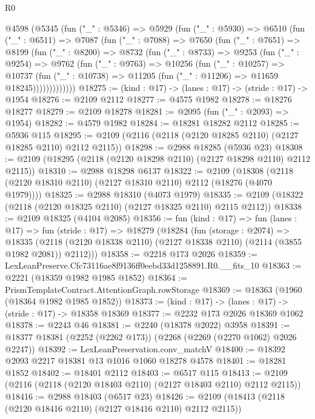 \begin{lexlean}{R0}
\begin{coremodule}
  @4598
    (@5345
      (fun ("_" : @5346) =>
      @5929
        (fun ("_" : @5930) =>
        @6510
          (fun ("_" : @6511) =>
          @7087
            (fun ("_" : @7088) =>
            @7650
              (fun ("_" : @7651) =>
              @8199
                (fun ("_" : @8200) =>
                @8732
                  (fun ("_" : @8733) =>
                  @9253
                    (fun ("_" : @9254) =>
                    @9762
                      (fun ("_" : @9763) =>
                      @10256
                        (fun ("_" : @10257) =>
                        @10737
                          (fun ("_" : @10738) =>
                          @11205 (fun ("_" : @11206) => @11659 @18245)))))))))))))
@18275 := (kind : @17) -> (lanes : @17) -> (stride : @17) -> @1954
@18276 := @2109 @2112
@18277 := @4575 @1982
@18278 := @18276 @18277
@18279 := @2109 @18278
@18281 := @2095 (fun ("_" : @2093) => @1954)
@18282 := @4579 @1982
@18284 := @18281 @18282 @2112
@18285 := @5936 @115
@18295 := @2109 (@2116 (@2118 (@2120 @18285 @2110) (@2127 @18285 @2110) @2112 @2115))
@18298 := @2988 @18285 (@5936 @23)
@18308 := @2109 (@18295 (@2118 (@2120 @18298 @2110) (@2127 @18298 @2110) @2112 @2115))
@18310 := @2988 @18298 @6137
@18322 := @2109
    (@18308 (@2118 (@2120 @18310 @2110) (@2127 @18310 @2110) @2112 (@18276 (@4070 @1979))))
@18325 := @2988 @18310 (@4073 @1979)
@18335 := @2109 (@18322 (@2118 (@2120 @18325 @2110) (@2127 @18325 @2110) @2115 @2112))
@18338 := @2109 @18325 (@4104 @2085)
@18356 := fun (kind : @17) =>
  fun (lanes : @17) =>
  fun (stride : @17) =>
  @18279
    (@18284
      (fun (storage : @2074) =>
      @18335 (@2118 (@2120 @18338 @2110) (@2127 @18338 @2110) (@2114 (@3855 @1982 @2081)) @2112)))
@18358 := @2218 @173 @2026
@18359 := LexLeanPreserve.Cfc73116ae8f9136ff0eebd33d1258891.R0.__fits_10
@18363 := @2221 (@18359 @1982 @1985 @1852)
@18364 := PrismTemplateContract.AttentionGraph.rowStorage
@18369 := @18363 (@1960 (@18364 @1982 @1985 @1852))
@18373 := (kind : @17) -> (lanes : @17) -> (stride : @17) -> @18358 @18369
@18377 := @2232 @173 @2026 @18369 @1062
@18378 := @2243 @46
@18381 := @2240 (@18378 @2022) @3958
@18391 := @18377 @18381 (@2252 (@2262 @173)) (@2268 (@2269 (@2270 @1062) @2026 @2247))
@18392 := LexLeanPreservation.conv_matchV
@18400 := @18392 @2093 @2217 @18381 @13 @1016 @1060 @18278 @4578
@18401 := @18281 @1852
@18402 := @18401 @2112
@18403 := @6517 @115
@18413 := @2109 (@2116 (@2118 (@2120 @18403 @2110) (@2127 @18403 @2110) @2112 @2115))
@18416 := @2988 @18403 (@6517 @23)
@18426 := @2109 (@18413 (@2118 (@2120 @18416 @2110) (@2127 @18416 @2110) @2112 @2115))

\end{coremodule}
\end{lexlean}
